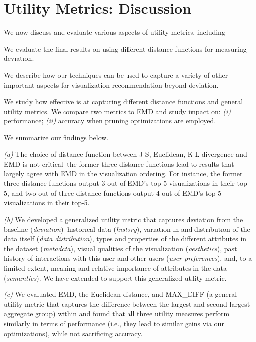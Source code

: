 
\section{Utility Metrics: Discussion}
\label{sec:discussion}
We now discuss and evaluate various aspects of utility metrics,
including 

 We evaluate the final results on
using different distance functions for measuring deviation.

 We describe how our 
techniques can be used to capture a variety of other important aspects
for visualization recommendation beyond deviation. 

 We study how
effective \SeeDB is at capturing
different distance functions and general utility metrics. We compare two
metrics to EMD and study impact on:
{\it (i)} performance; 
{\it (ii)} accuracy when pruning optimizations are employed.


We summarize our findings below.
\begin{denselist}
\item {\em (a)} The choice of distance function between J-S, Euclidean, K-L divergence
and EMD is not critical: the former three distance functions lead
to results that largely
agree with EMD in the visualization ordering. For instance, the
former three distance functions output 3 out of EMD's top-5 visualizations 
in their top-5, and
two out of three distance functions output 4 out of EMD's top-5 visualizations in their top-5.
\item {\em (b)} We developed a generalized utility metric
that captures   deviation from the baseline ({\it deviation}),
historical data ({\em history}),
variation in and distribution of the data itself ({\it data distribution}),
types and properties of the different attributes in the dataset ({\it metadata}), 
visual qualities of the visualization ({\it aesthetics}),  
past history of interactions with this user and other users ({\it user preferences}), and,
to a limited extent,
meaning and relative importance of attributes in the data ({\it semantics}).
We have extended \SeeDB to support this generalized utility metric. 
\item {\em (c)} We evaluated EMD, the Euclidean distance, and MAX\_DIFF
(a general utility metric that captures the difference between the largest
and second largest aggregate group) within \SeeDB and found that
all three utility measures perform similarly in terms of performance 
(i.e., they lead to similar gains via our optimizations),
while not sacrificing accuracy. 
\end{denselist}


